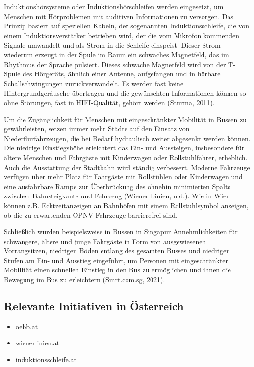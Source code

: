 \documentclass[
]{book}
\providecommand{\tightlist}{%
  \setlength{\itemsep}{0pt}\setlength{\parskip}{0pt}}
\begin{document}
Induktionshörsysteme oder Induktionshörschleifen werden eingesetzt, um Menschen mit Hörproblemen mit auditiven Informationen zu versorgen. Das Prinzip basiert auf speziellen Kabeln, der sogenannten Induktionsschleife, die von einem Induktionsverstärker betrieben wird, der die vom Mikrofon kommenden Signale umwandelt und als Strom in die Schleife einspeist. Dieser Strom wiederum erzeugt in der Spule im Raum ein schwaches Magnetfeld, das im Rhythmus der Sprache pulsiert. Dieses schwache Magnetfeld wird von der T-Spule des Hörgeräts, ähnlich einer Antenne, aufgefangen und in hörbare Schallschwingungen zurückverwandelt. Es werden fast keine Hintergrundgeräusche übertragen und die gewünschten Informationen können so ohne Störungen, fast in HIFI-Qualität, gehört werden (Sturma, 2011).

Um die Zugänglichkeit für Menschen mit eingeschränkter Mobilität in Bussen zu gewährleisten, setzen immer mehr Städte auf den Einsatz von Niederflurfahrzeugen, die bei Bedarf hydraulisch weiter abgesenkt werden können. Die niedrige Einstiegshöhe erleichtert das Ein- und Aussteigen, insbesondere für ältere Menschen und Fahrgäste mit Kinderwagen oder Rollstuhlfahrer, erheblich. Auch die Ausstattung der Stadtbahn wird ständig verbessert. Moderne Fahrzeuge verfügen über mehr Platz für Fahrgäste mit Rollstühlen oder Kinderwagen und eine ausfahrbare Rampe zur Überbrückung des ohnehin minimierten Spalts zwischen Bahnsteigkante und Fahrzeug (Wiener Linien, n.d.). Wie in Wien können z.B. Echtzeitanzeigen an Bahnhöfen mit einem Rollstuhlsymbol anzeigen, ob die zu erwartenden ÖPNV-Fahrzeuge barrierefrei sind.

Schließlich wurden beispielsweise in Bussen in Singapur Annehmlichkeiten für schwangere, ältere und junge Fahrgäste in Form von ausgewiesenen Vorrangsitzen, niedrigen Böden entlang des gesamten Busses und niedrigen Stufen am Ein- und Ausstieg eingeführt, um Personen mit eingeschränkter Mobilität einen schnellen Einstieg in den Bus zu ermöglichen und ihnen die Bewegung im Bus zu erleichtern (Smrt.com.sg, 2021).

\hypertarget{relevante-initiativen-in-uxf6sterreich-27}{%
\subsection*{Relevante Initiativen in Österreich}\label{relevante-initiativen-in-uxf6sterreich-27}}

\begin{itemize}
\tightlist
\item
  \href{https://www.oebb.at/de/reiseplanung-services/barrierefrei-reisen}{oebb.at}
\item
  \href{https://www.wienerlinien.at/web/wiener-linien/neue-bim-und-bus-haltestellen-f\%C3\%BCr-wien}{wienerlinien.at}
\item
  \href{https://www.induktionsschleife.at/}{induktionsschleife.at}
\end{itemize}
\end{document}
